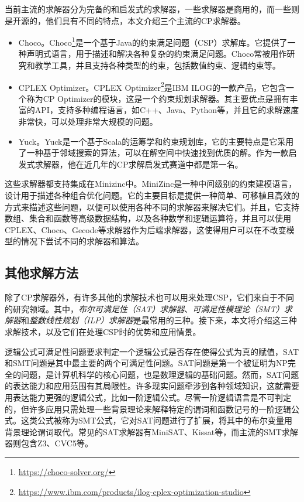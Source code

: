 当前主流的求解器分为完备的和启发式的求解器，一些求解器是商用的，而一些则是开源的，他们具有不同的特点，本文介绍三个主流的CP求解器。

\begin{itemize}
    \item Choco。Choco\footnote{\href{https://choco-solver.org/}{https://choco-solver.org/}}是一个基于Java的约束满足问题（CSP）求解库。它提供了一种声明式语言，用于描述和解决各种复杂的约束满足问题。Choco常被用作研究和教学工具，并且支持各种类型的约束，包括数值约束、逻辑约束等。
    \item CPLEX Optimizer。CPLEX Optimizer\footnote{\href{https://www.ibm.com/products/ilog-cplex-optimization-studio}{https://www.ibm.com/products/ilog-cplex-optimization-studio}}是IBM ILOG的一款产品，它包含一个称为CP Optimizer的模块，这是一个约束规划求解器。其主要优点是拥有丰富的API，支持多种编程语言，如C++、Java、Python等，并且它的求解速度非常快，可以处理非常大规模的问题。
    \item Yuck。Yuck是一个基于Scala的运筹学和约束规划库，它的主要特点是它采用了一种基于邻域搜索的算法，可以在解空间中快速找到优质的解。作为一款启发式求解器，他在近几年的CP求解启发式赛道中都是第一名。
\end{itemize}

这些求解器都支持集成在Minizinc\cite{nethercote2007minizinc}中。MiniZinc是一种中间级别的约束建模语言，设计用于描述各种组合优化问题。它的主要目标是提供一种简单、可移植且高效的方式来描述这些问题，以便可以使用各种不同的求解器来解决它们。并且，它支持数组、集合和函数等高级数据结构，以及各种数学和逻辑运算符，并且可以使用CPLEX、Choco、Gecode等求解器作为后端求解器，这使得用户可以在不改变模型的情况下尝试不同的求解器和算法。

\subsection{其他求解方法}

除了CP求解器外，有许多其他的求解技术也可以用来处理CSP，它们来自于不同的研究领域。其中，\textit{布尔可满足性（SAT）求解器}、\textit{可满足性模理论（SMT）求解器}和\textit{整数线性规划（ILP）求解器}是最常用的三种。接下来，本文将介绍这三种求解技术，以及它们在处理CSP时的优势和应用情景。

逻辑公式可满足性问题要求判定一个逻辑公式是否存在使得公式为真的赋值，SAT和SMT问题是其中最主要的两个可满足性问题。SAT问题是第一个被证明为NP完全的问题，是计算机科学的核心问题，也是数理逻辑的基础问题。然而，SAT问题的表达能力和应用范围有其局限性。许多现实问题牵涉到各种领域知识，这就需要用表达能力更强的逻辑公式，比如一阶逻辑公式。尽管一阶逻辑语言是不可判定的，但许多应用只需处理一些背景理论来解释特定的谓词和函数记号的一阶逻辑公式。这类公式被称为SMT公式，它对SAT问题进行了扩展，将其中的布尔变量用背景理论谓词取代。常见的SAT求解器有MiniSAT、Kissat等，而主流的SMT求解器则包含Z3、CVC5等。


